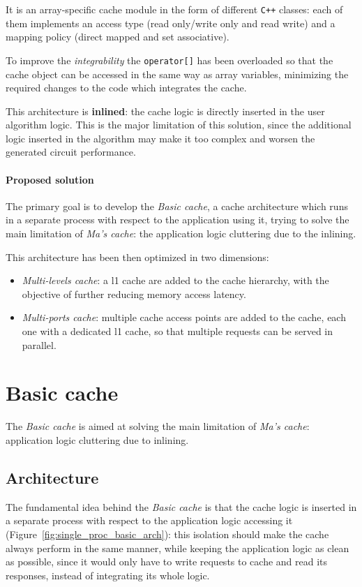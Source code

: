 \documentclass[11pt,a4paper,oneside]{memoir}
\begin{document}
It is an array-specific cache module in the form of different \texttt{C++}
classes: each of them implements an access type (read only/write only and read
write) and a mapping policy (direct mapped and set associative).

To improve the \emph{integrability} the \texttt{operator[]} has been overloaded
so that the cache object can be accessed in the same way as array variables,
minimizing the required changes to the code which integrates the cache.

\bigskip
This architecture is \textbf{inlined}: the cache logic is directly inserted in
the user algorithm logic.
This is the major limitation of this solution, since the additional logic
inserted in the algorithm may make it too complex and worsen the generated
circuit performance.

\paragraph{Proposed solution}
The primary goal is to develop the \emph{Basic cache}, a cache architecture
which runs in a separate process with respect to the application using it,
trying to solve the main limitation of \emph{Ma's cache}: the application logic
cluttering due to the inlining.

This architecture has been then optimized in two dimensions:
\begin{itemize}
	\item \emph{Multi-levels cache}: a \ac{l1} cache are added to the cache
		hierarchy, with the objective of further reducing memory access
		latency.
	\item \emph{Multi-ports cache}: multiple cache access points are added
		to the cache, each one with a dedicated \ac{l1} cache, so that
		multiple requests can be served in parallel.
\end{itemize}

\section{Basic cache}
The \emph{Basic cache} is aimed at solving the main limitation of \emph{Ma's
cache}: application logic cluttering due to inlining.

\subsection{Architecture}
The fundamental idea behind the \emph{Basic cache} is that the cache logic is
inserted in a separate process with respect to the application logic accessing
it (Figure~\ref{fig:single_proc_basic_arch}): this isolation should make the
cache always perform in the same manner, while keeping the application logic as
clean as possible, since it would only have to write requests to cache and read
its responses, instead of integrating its whole logic.
\end{document}
